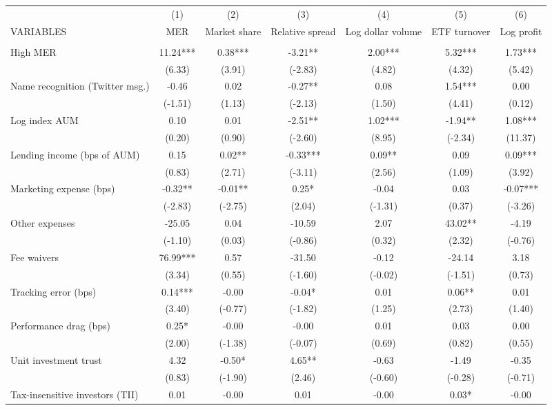 \documentclass[]{article}
\begin{document}
\begin{tabular}{lcccccc} \hline
 & (1) & (2) & (3) & (4) & (5) & (6) \\
VARIABLES & MER & Market share & Relative spread & Log dollar volume & ETF turnover & Log profit \\ \hline
 &  &  &  &  &  &  \\
High MER & 11.24*** & 0.38*** & -3.21** & 2.00*** & 5.32*** & 1.73*** \\
 & (6.33) & (3.91) & (-2.83) & (4.82) & (4.32) & (5.42) \\
Name recognition (Twitter msg.) & -0.46 & 0.02 & -0.27** & 0.08 & 1.54*** & 0.00 \\
 & (-1.51) & (1.13) & (-2.13) & (1.50) & (4.41) & (0.12) \\
Log index AUM & 0.10 & 0.01 & -2.51** & 1.02*** & -1.94** & 1.08*** \\
 & (0.20) & (0.90) & (-2.60) & (8.95) & (-2.34) & (11.37) \\
Lending income (bps of AUM) & 0.15 & 0.02** & -0.33*** & 0.09** & 0.09 & 0.09*** \\
 & (0.83) & (2.71) & (-3.11) & (2.56) & (1.09) & (3.92) \\
Marketing expense (bps) & -0.32** & -0.01** & 0.25* & -0.04 & 0.03 & -0.07*** \\
 & (-2.83) & (-2.75) & (2.04) & (-1.31) & (0.37) & (-3.26) \\
Other expenses & -25.05 & 0.04 & -10.59 & 2.07 & 43.02** & -4.19 \\
 & (-1.10) & (0.03) & (-0.86) & (0.32) & (2.32) & (-0.76) \\
Fee waivers & 76.99*** & 0.57 & -31.50 & -0.12 & -24.14 & 3.18 \\
 & (3.34) & (0.55) & (-1.60) & (-0.02) & (-1.51) & (0.73) \\
Tracking error (bps) & 0.14*** & -0.00 & -0.04* & 0.01 & 0.06** & 0.01 \\
 & (3.40) & (-0.77) & (-1.82) & (1.25) & (2.73) & (1.40) \\
Performance drag (bps) & 0.25* & -0.00 & -0.00 & 0.01 & 0.03 & 0.00 \\
 & (2.00) & (-1.38) & (-0.07) & (0.69) & (0.82) & (0.55) \\
Unit investment trust & 4.32 & -0.50* & 4.65** & -0.63 & -1.49 & -0.35 \\
 & (0.83) & (-1.90) & (2.46) & (-0.60) & (-0.28) & (-0.71) \\
Tax-insensitive investors (TII) & 0.01 & -0.00 & 0.01 & -0.00 & 0.03* & -0.00 \\

\end{tabular}
\end{document}
